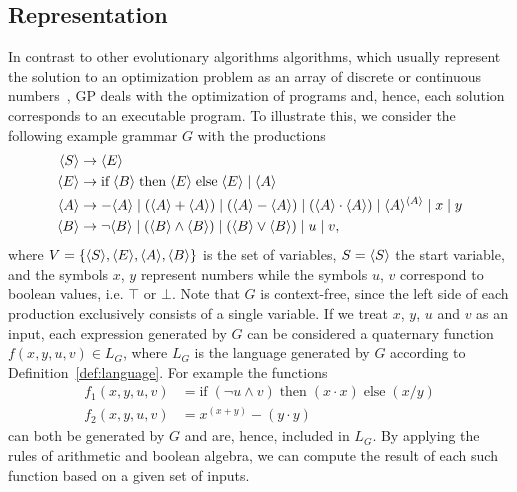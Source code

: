 \subsection{Representation}
In contrast to other evolutionary algorithms algorithms, which usually represent the solution to an optimization problem as an array of discrete or continuous numbers~\cite{back1997handbook}, GP deals with the optimization of programs and, hence, each solution corresponds to an executable program.
To illustrate this, we consider the following example grammar $G$ with the productions
\begin{equation}
	\begin{split}
		\langle S \rangle & \to \langle E \rangle \\
		\langle E \rangle & \to \text{if} \; \langle B \rangle \; \text{then} \; \langle E \rangle \; \text{else} \; \langle E \rangle \; | \; \langle A \rangle \\
		\langle A \rangle & \to -\langle A \rangle \; | \; (\langle A \rangle + \langle A \rangle) \; | \; (\langle A \rangle - \langle A \rangle) \; | \; (\langle A \rangle \cdot \langle A \rangle) \; | \; \langle A \rangle^{\langle A \rangle} \; | \; x \; | \; y \\  
		\langle B \rangle & \to \neg \langle B \rangle \; | \; (\langle B \rangle \wedge \langle B \rangle) \; | \; (\langle B \rangle \vee \langle B \rangle) \; | \; u \; | \; v,
	\end{split}
\label{eq:gp-example-grammar}
\end{equation}
where $V = \{\langle S \rangle, \langle E \rangle, \langle A \rangle, \langle B \rangle\}$ is the set of variables, $S = \langle S \rangle$ the start variable, and the symbols $x$, $y$ represent numbers while the symbols $u$, $v$ correspond to boolean values, i.e. $\top$ or $\bot$.
Note that $G$ is context-free, since the left side of each production exclusively consists of a single variable.
If we treat $x$, $y$, $u$ and $v$ as an input, each expression generated by $G$ can be considered a quaternary function $f(x,y,u,v) \in L_{G}$, where $L_G$ is the language generated by $G$ according to Definition~\ref{def:language}.
For example the functions
\begin{equation}
	\begin{split}
		f_1(x,y,u,v) & = \text{if} \; (\neg u \wedge v) \; \text{then} \; (x \cdot x) \; \text{else} \; (x / y) \\
		f_2(x,y,u,v) & = x^{(x + y)} - (y \cdot y)
	\end{split}
\label{eq:gp-example-functions}
\end{equation} can both be generated by $G$ and are, hence, included in $L_G$.
By applying the rules of arithmetic and boolean algebra, we can compute the result of each such function based on a given set of inputs.
